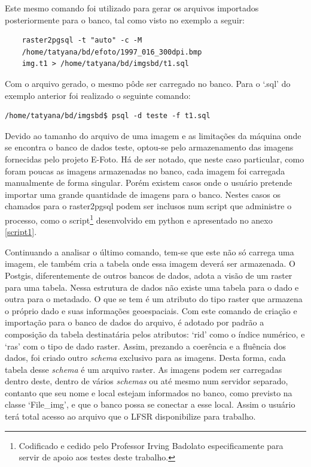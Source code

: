Este mesmo comando foi utilizado para gerar os arquivos importados posteriormente para o banco, tal como visto no exemplo a seguir:

\begin{verbatim}
    raster2pgsql -t "auto" -c -M
    /home/tatyana/bd/efoto/1997_016_300dpi.bmp
    img.t1 > /home/tatyana/bd/imgsbd/t1.sql
\end{verbatim}

Com o arquivo gerado, o mesmo pôde ser carregado no banco. Para o `.sql' do exemplo anterior foi realizado o seguinte comando:

\begin{verbatim}
/home/tatyana/bd/imgsbd$ psql -d teste -f t1.sql    
\end{verbatim}

Devido ao tamanho do arquivo de uma imagem e as limitações da máquina onde se encontra o banco de dados teste, optou-se pelo armazenamento das imagens fornecidas pelo projeto E-Foto. Há de ser notado, que neste caso particular, como foram poucas as imagens armazenadas no banco, cada imagem foi carregada manualmente de forma singular. Porém existem casos onde o usuário pretende importar uma grande quantidade de imagens para o banco. Nestes casos os chamados para o raster2pgsql podem ser inclusos num script que administre o processo, como o script\footnote{Codificado e cedido pelo Professor Irving Badolato especificamente para servir de apoio aos testes deste trabalho.} desenvolvido em python e apresentado no anexo \ref{script1}.

Continuando a analisar o último comando, tem-se que este não só carrega uma imagem, ele também cria a tabela onde essa imagem deverá ser armazenada. O Postgis, diferentemente de outros bancos de dados, adota a visão de um raster para uma tabela. Nessa estrutura de dados não existe uma tabela para o dado e outra para o metadado. O que se tem é um atributo do tipo raster que armazena o próprio dado e suas informações geoespaciais. Com este comando de criação e importação para o banco de dados do arquivo, é adotado por padrão a composição da tabela destinatária pelos atributos: `rid' como o índice numérico, e `ras' com o tipo de dado raster. Assim, prezando a coerência e a fluência dos dados, foi criado outro \textit{schema} exclusivo para as imagens. Desta forma, cada tabela desse \textit{schema} é um arquivo raster. As imagens podem ser carregadas dentro deste, dentro de vários \textit{schemas} ou até mesmo num servidor separado, contanto que seu nome e local estejam informados no banco, como previsto na classe `File\_img', e que o banco possa se conectar a esse local. Assim o usuário terá total acesso ao arquivo que o LFSR disponibilize para trabalho.

